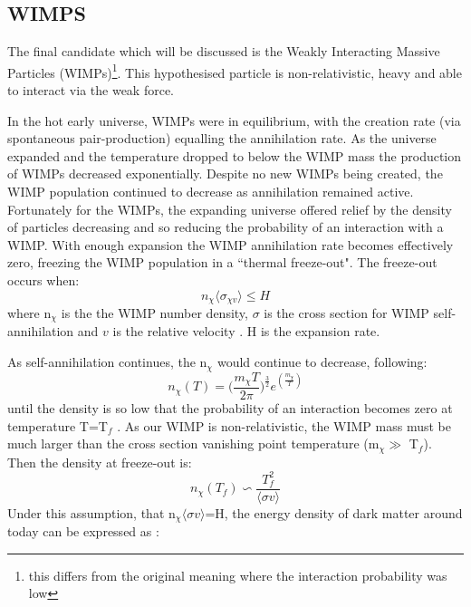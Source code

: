 \subsection{WIMPS}
\label{sec:wimp_as_a_candidate}
\par
The final candidate which will be discussed is the Weakly Interacting Massive Particles (WIMPs)\footnote{this differs from the original meaning where the interaction probability was low}.
This hypothesised particle is non-relativistic, heavy and able to interact via the weak force.
\par
In the hot early universe, WIMPs were in equilibrium, with the creation rate (via spontaneous pair-production) equalling the annihilation rate.
As the universe expanded and the temperature dropped to below the WIMP mass the production of WIMPs decreased exponentially.
Despite no new WIMPs being created, the WIMP population continued to decrease as annihilation remained active.
Fortunately for the WIMPs, the expanding universe offered relief by the density of particles decreasing and so reducing the probability of an interaction with a WIMP.
With enough expansion the WIMP annihilation rate becomes effectively zero, freezing the WIMP population in a ``thermal freeze-out".
The freeze-out occurs when:
\begin{equation}
    n_\chi \langle \sigma_{\chi v} \rangle \leq H
\end{equation}
where n$_\chi$ is the the WIMP number density, $\sigma$ is the cross section for WIMP self-annihilation and $v$ is the relative velocity \cite{wimp_theory_ref}.
H is the expansion rate.
\par
As self-annihilation continues, the n$_\chi$ would continue to decrease, following:
\begin{equation}
    n_\chi(T) = \bigg(\frac{m_\chi T}{2\pi}\bigg)^{\frac{3}{2}} e^{(\frac{m_\chi}{T})}
\end{equation}
until the density is so low that the probability of an interaction becomes zero at temperature T=T$_f$ \cite{wimp_theory_ref}.
As our WIMP is non-relativistic, the WIMP mass must be much larger than the cross section vanishing point temperature (m$_\chi \gg$ T$_f$).
Then the density at freeze-out is:
\begin{equation}
    n_\chi(T_f) \backsim \frac{T^2_f}{\langle \sigma v \rangle}
\end{equation}
Under this assumption, that n$_\chi \langle \sigma v \rangle$=H, the energy density of dark matter around today can be expressed as \cite{less_of_a_wimp_miracle_ref}:
